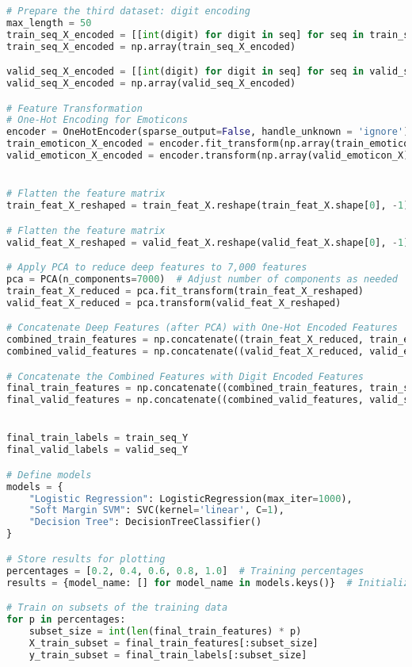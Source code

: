 \documentclass{article} %
\begin{document}
\begin{lstlisting}[language=Python]
# Prepare the third dataset: digit encoding
max_length = 50
train_seq_X_encoded = [[int(digit) for digit in seq] for seq in train_seq_X]
train_seq_X_encoded = np.array(train_seq_X_encoded)

valid_seq_X_encoded = [[int(digit) for digit in seq] for seq in valid_seq_X]
valid_seq_X_encoded = np.array(valid_seq_X_encoded)

# Feature Transformation
# One-Hot Encoding for Emoticons
encoder = OneHotEncoder(sparse_output=False, handle_unknown = 'ignore')
train_emoticon_X_encoded = encoder.fit_transform(np.array(train_emoticon_X).reshape(-1, 1))
valid_emoticon_X_encoded = encoder.transform(np.array(valid_emoticon_X).reshape(-1, 1))


# Flatten the feature matrix
train_feat_X_reshaped = train_feat_X.reshape(train_feat_X.shape[0], -1) 

# Flatten the feature matrix
valid_feat_X_reshaped = valid_feat_X.reshape(valid_feat_X.shape[0], -1)  

# Apply PCA to reduce deep features to 7,000 features
pca = PCA(n_components=7000)  # Adjust number of components as needed
train_feat_X_reduced = pca.fit_transform(train_feat_X_reshaped)
valid_feat_X_reduced = pca.transform(valid_feat_X_reshaped)

# Concatenate Deep Features (after PCA) with One-Hot Encoded Features
combined_train_features = np.concatenate((train_feat_X_reduced, train_emoticon_X_encoded), axis=1)
combined_valid_features = np.concatenate((valid_feat_X_reduced, valid_emoticon_X_encoded), axis=1)

# Concatenate the Combined Features with Digit Encoded Features
final_train_features = np.concatenate((combined_train_features, train_seq_X_encoded), axis=1)
final_valid_features = np.concatenate((combined_valid_features, valid_seq_X_encoded), axis=1)


final_train_labels = train_seq_Y
final_valid_labels = valid_seq_Y

# Define models
models = {
    "Logistic Regression": LogisticRegression(max_iter=1000),
    "Soft Margin SVM": SVC(kernel='linear', C=1),
    "Decision Tree": DecisionTreeClassifier()
}

# Store results for plotting
percentages = [0.2, 0.4, 0.6, 0.8, 1.0]  # Training percentages
results = {model_name: [] for model_name in models.keys()}  # Initialize results

# Train on subsets of the training data
for p in percentages:
    subset_size = int(len(final_train_features) * p)
    X_train_subset = final_train_features[:subset_size]
    y_train_subset = final_train_labels[:subset_size]


\end{lstlisting}
\end{document}
